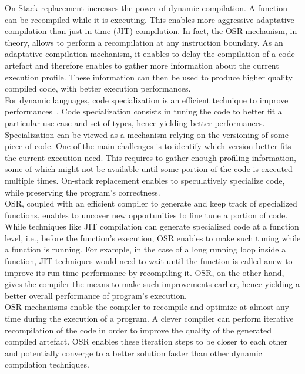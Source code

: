 
On-Stack replacement increases the power of dynamic compilation.
A function can be recompiled while it is executing.
This enables more aggressive adaptative compilation than just-in-time (JIT) compilation.
In fact, the OSR mechanism, in theory, allows to perform a recompilation at any instruction boundary. 
As an adaptative compilation mechanism, it enables to delay the compilation of a code artefact and therefore enables to gather more information about the current execution profile.
These information can then be used to produce higher quality compiled code, with better execution performances.\\

For dynamic languages, code specialization is an efficient technique to improve performances~\cite{gal2009trace}.
Code specialization consists in tuning the code to better fit a particular use case and set of types, hence yielding better performances.
Specialization can be viewed as a mechanism relying on the versioning of some piece of code.
One of the main challenges is to identify which version better fits the current execution need.
This requires to gather enough profiling information, some of which might not be available until some portion of the code is executed multiple times.
On-stack replacement enables to speculatively specialize code, while preserving the program's correctness.\\

OSR, coupled with an efficient compiler to generate and keep track of specialized functions, enables to uncover new opportunities to fine tune a portion of code.
While techniques like JIT compilation can generate specialized code at a function level, i.e., before the function's execution, OSR enables to make such tuning while a function is running.
For example, in the case of a long running loop inside a function, JIT techniques would need to wait until the function is called anew to improve its run time performance by recompiling it. 
OSR, on the other hand, gives the compiler the means to make such improvements earlier, hence yielding a better overall performance of program's execution.\\

OSR mechanisms enable the compiler to recompile and optimize at almost any time during the execution of a program.
A clever compiler can perform iterative recompilation of the code in order to improve the quality of the generated compiled artefact.
OSR enables these iteration steps to be closer to each other and potentially converge to a better solution faster than other dynamic compilation techniques.\\

